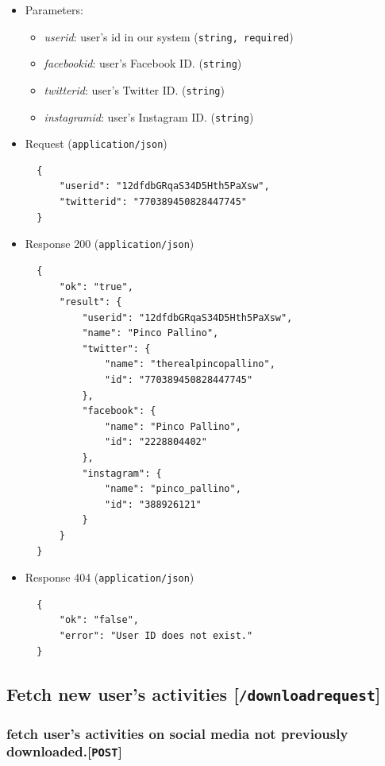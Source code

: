 \begin{itemize}
\item Parameters:
	\begin{itemize}
	\item \textit{userid}: user's id in our system (\texttt{string, required})
	\item \textit{facebookid}: user's Facebook ID. (\texttt{string})
	\item \textit{twitterid}: user's Twitter ID. (\texttt{string})
	\item \textit{instagramid}: user's Instagram ID. (\texttt{string})
	\end{itemize}
\item
  Request (\texttt{application/json})

\begin{verbatim}
  {
      "userid": "12dfdbGRqaS34D5Hth5PaXsw",
      "twitterid": "770389450828447745"
  }
\end{verbatim}
\item
  Response 200 (\texttt{application/json})

\begin{verbatim}
  {
      "ok": "true",
      "result": {
          "userid": "12dfdbGRqaS34D5Hth5PaXsw",
          "name": "Pinco Pallino",
          "twitter": {
              "name": "therealpincopallino",
              "id": "770389450828447745"
          },
          "facebook": {
              "name": "Pinco Pallino",
              "id": "2228804402"
          },
          "instagram": {
              "name": "pinco_pallino",
              "id": "388926121"
          }
      }
  }
\end{verbatim}
\item
  Response 404 (\texttt{application/json})

\begin{verbatim}
  {
      "ok": "false",
      "error": "User ID does not exist."
  }
\end{verbatim}
\end{itemize}

\subsection{Fetch new user's activities {[}\protect\texttt{/downloadrequest}{]}}
\label{sec:APIdownloadrequest}
\subsubsection{fetch user's activities on social media not previously downloaded.{[}\protect\texttt{POST}{]}}

